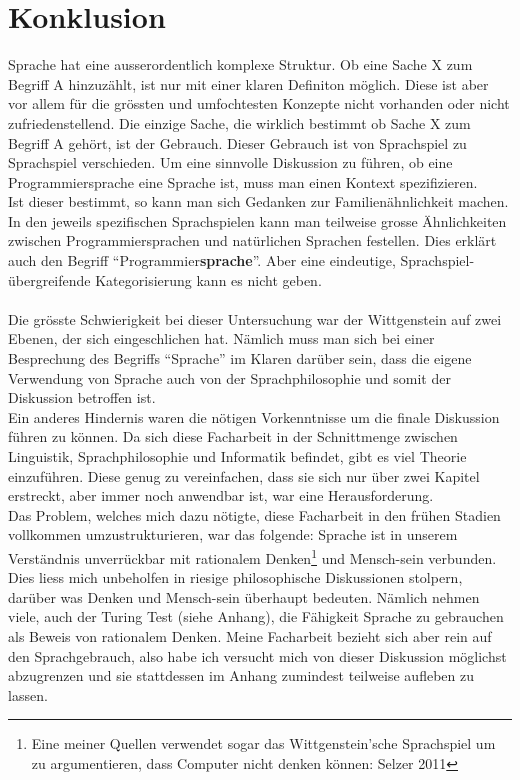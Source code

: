 \documentclass[10pt,a4paper]{article}
\begin{document}
\section{Konklusion}
Sprache hat eine ausserordentlich komplexe Struktur. Ob eine Sache X zum Begriff A hinzuzählt, ist nur mit einer klaren Definiton möglich. Diese ist aber vor allem für die grössten und umfochtesten Konzepte nicht vorhanden oder nicht zufriedenstellend.
Die einzige Sache, die wirklich bestimmt ob Sache X zum Begriff A gehört, ist der Gebrauch.
Dieser Gebrauch ist von Sprachspiel zu Sprachspiel verschieden.
Um eine sinnvolle Diskussion zu führen, ob eine Programmiersprache eine Sprache ist, muss man einen Kontext spezifizieren. \\
Ist dieser bestimmt, so kann man sich Gedanken zur Familienähnlichkeit machen.
In den jeweils spezifischen Sprachspielen kann man teilweise grosse Ähnlichkeiten zwischen Programmiersprachen und natürlichen Sprachen festellen. Dies erklärt auch den Begriff \enquote{Programmier\textbf{sprache}}. Aber eine eindeutige, Sprachspiel-übergreifende Kategorisierung kann es nicht geben. \\
\\
Die grösste Schwierigkeit bei dieser Untersuchung war der Wittgenstein auf zwei Ebenen, der sich eingeschlichen hat. Nämlich muss man sich bei einer Besprechung des Begriffs \enquote{Sprache} im Klaren darüber sein, dass die eigene Verwendung von Sprache auch von der Sprachphilosophie und somit der Diskussion betroffen ist. \\
Ein anderes Hindernis waren die nötigen Vorkenntnisse um die finale Diskussion führen zu können. Da sich diese Facharbeit in der Schnittmenge zwischen Linguistik, Sprachphilosophie und Informatik befindet, gibt es viel Theorie einzuführen. Diese genug zu vereinfachen, dass sie sich nur über zwei Kapitel erstreckt, aber immer noch anwendbar ist, war eine Herausforderung. \\
Das Problem, welches mich dazu nötigte, diese Facharbeit in den frühen Stadien vollkommen umzustrukturieren, war das folgende: Sprache ist in unserem Verständnis unverrückbar mit rationalem Denken\footnote{Eine meiner Quellen verwendet sogar das Wittgenstein'sche Sprachspiel um zu argumentieren, dass Computer nicht denken können: Selzer 2011} und Mensch-sein verbunden. Dies liess mich unbeholfen in riesige philosophische Diskussionen stolpern, darüber was Denken und Mensch-sein überhaupt bedeuten. Nämlich nehmen viele, auch der Turing Test (siehe Anhang), die Fähigkeit Sprache zu gebrauchen als Beweis von rationalem Denken. Meine Facharbeit bezieht sich aber rein auf den Sprachgebrauch, also habe ich versucht mich von dieser Diskussion möglichst abzugrenzen und sie stattdessen im Anhang zumindest teilweise aufleben zu lassen. \\
\end{document}
